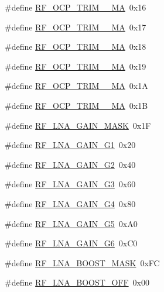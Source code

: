 \begin{DoxyCompactItemize}
\#define \hyperlink{sx1276Regs-Fsk_8h_a80d19cc2e70d7f878ee824f9ce0b0b8b}{R\+F\+\_\+\+O\+C\+P\+\_\+\+T\+R\+I\+M\+\_\+\_\+\+MA}~0x16
\item 
\#define \hyperlink{sx1276Regs-Fsk_8h_a5b9812e1a3678664f64af0c4bf22cf96}{R\+F\+\_\+\+O\+C\+P\+\_\+\+T\+R\+I\+M\+\_\+\_\+\+MA}~0x17
\item 
\#define \hyperlink{sx1276Regs-Fsk_8h_a03e5de0e6f345d7c6f813fe49a2f3a8d}{R\+F\+\_\+\+O\+C\+P\+\_\+\+T\+R\+I\+M\+\_\+\_\+\+MA}~0x18
\item 
\#define \hyperlink{sx1276Regs-Fsk_8h_a5857beccb0e3c2c875d33b7644ae7849}{R\+F\+\_\+\+O\+C\+P\+\_\+\+T\+R\+I\+M\+\_\+\_\+\+MA}~0x19
\item 
\#define \hyperlink{sx1276Regs-Fsk_8h_a87f10f8656ea5d103c7f4df386d1c8b6}{R\+F\+\_\+\+O\+C\+P\+\_\+\+T\+R\+I\+M\+\_\+\_\+\+MA}~0x1A
\item 
\#define \hyperlink{sx1276Regs-Fsk_8h_a26aa5a089e0f570046a41643fa416dce}{R\+F\+\_\+\+O\+C\+P\+\_\+\+T\+R\+I\+M\+\_\+\_\+\+MA}~0x1B
\item 
\#define \hyperlink{sx1276Regs-Fsk_8h_aecfcf32d325020275e659f18f096593a}{R\+F\+\_\+\+L\+N\+A\+\_\+\+G\+A\+I\+N\+\_\+\+M\+A\+SK}~0x1F
\item 
\#define \hyperlink{sx1276Regs-Fsk_8h_a64189fbd3e263a0cd23c565f1cda656e}{R\+F\+\_\+\+L\+N\+A\+\_\+\+G\+A\+I\+N\+\_\+\+G1}~0x20
\item 
\#define \hyperlink{sx1276Regs-Fsk_8h_a5db88ff1f5dcbf3e2e73aa95b7b9e395}{R\+F\+\_\+\+L\+N\+A\+\_\+\+G\+A\+I\+N\+\_\+\+G2}~0x40
\item 
\#define \hyperlink{sx1276Regs-Fsk_8h_a27cb701834892c250a7859261e26d7da}{R\+F\+\_\+\+L\+N\+A\+\_\+\+G\+A\+I\+N\+\_\+\+G3}~0x60
\item 
\#define \hyperlink{sx1276Regs-Fsk_8h_a313f47fe3c3dc5879cfdfa74ecebd9db}{R\+F\+\_\+\+L\+N\+A\+\_\+\+G\+A\+I\+N\+\_\+\+G4}~0x80
\item 
\#define \hyperlink{sx1276Regs-Fsk_8h_ab2fcc04cefd1433048655c2b49e95204}{R\+F\+\_\+\+L\+N\+A\+\_\+\+G\+A\+I\+N\+\_\+\+G5}~0x\+A0
\item 
\#define \hyperlink{sx1276Regs-Fsk_8h_a33e9322adb51544aa391dc909ab83516}{R\+F\+\_\+\+L\+N\+A\+\_\+\+G\+A\+I\+N\+\_\+\+G6}~0x\+C0
\item 
\#define \hyperlink{sx1276Regs-Fsk_8h_a00faa959b2d9cdedea58962da0579c96}{R\+F\+\_\+\+L\+N\+A\+\_\+\+B\+O\+O\+S\+T\+\_\+\+M\+A\+SK}~0x\+FC
\item 
\#define \hyperlink{sx1276Regs-Fsk_8h_a83f435e55a947239e4b0a971e57384fb}{R\+F\+\_\+\+L\+N\+A\+\_\+\+B\+O\+O\+S\+T\+\_\+\+O\+FF}~0x00

\end{DoxyCompactItemize}
